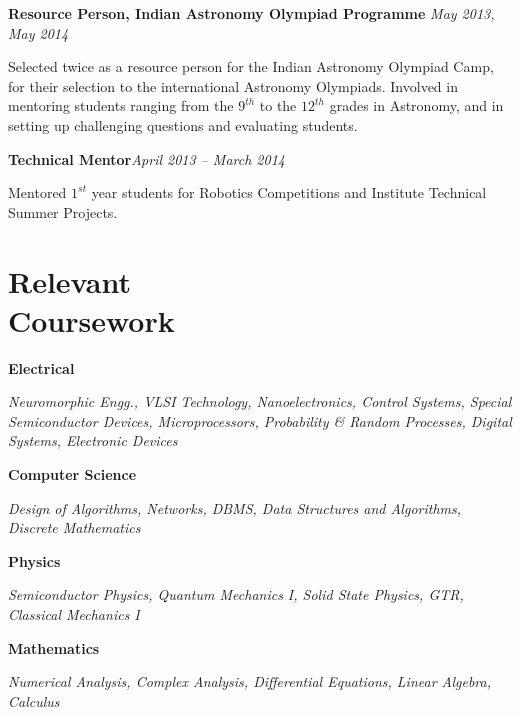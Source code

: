 \documentclass[margin,line]{res}
\newenvironment{list1}{
  \begin{list}{\ding{113}}{%
      \setlength{\itemsep}{0in}
      \setlength{\parsep}{0in} \setlength{\parskip}{0in}
      \setlength{\topsep}{0in} \setlength{\partopsep}{0in} 
      \setlength{\leftmargin}{0.17in}}}{\end{list}}
\begin{document}
\begin{resume}
\vspace*{-0.1in}

\textbf{Resource Person, Indian Astronomy Olympiad Programme} \hfill \textit{May 2013, May 2014} \\
\vspace*{-.15in}
\begin{list1}
\item[] Selected twice as a resource person for the Indian Astronomy Olympiad Camp, for their selection to the international Astronomy Olympiads. Involved in mentoring students ranging from the $9^{th}$ to the $12^{th}$ grades in Astronomy, and in setting up challenging questions and evaluating students.
\end{list1}

\vspace*{-0.1in}

\textbf{Technical Mentor}\hfill \textit{April 2013 -- March 2014} \\
\vspace*{-.15in}
\begin{list1}
\item[] Mentored $1^{st}$ year students for Robotics Competitions and Institute Technical Summer Projects.
\end{list1}

\section{\sc Relevant \\Coursework} 
\begin{list1}
\item[\strut\hspace{0.5cm}\hypertarget{crselst}{\textbf{Electrical}}]
\item[]\textit{Neuromorphic Engg., VLSI Technology, Nanoelectronics, Control Systems, Special Semiconductor Devices, Microprocessors, Probability \& Random Processes, Digital Systems, Electronic Devices}
\item[\strut\hspace{0.5cm}\textbf{Computer Science}]
\vspace{0.05in}
\item[]\textit{Design of Algorithms, Networks, DBMS, Data Structures and Algorithms, Discrete Mathematics}
\item[\strut\hspace{0.5cm}\textbf{Physics}]
\vspace{0.05in}
\item[]\textit{Semiconductor Physics, Quantum Mechanics I, Solid State Physics, GTR, Classical Mechanics I}
\item[\strut\hspace{0.5cm}\textbf{Mathematics}]
\vspace{0.05in}
\item[]\textit{Numerical Analysis, Complex Analysis, Differential Equations, Linear Algebra, Calculus}
\end{list1}


\end{resume}
\end{document}
